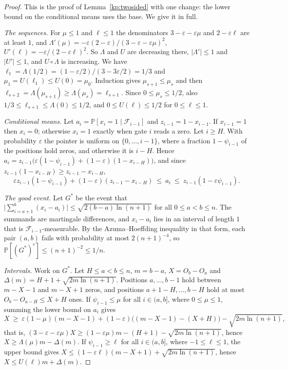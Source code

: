 \documentclass[11pt]{amsart}
\theoremstyle{definition}
\theoremstyle{remark}
\newcommand{\eps}{\varepsilon}
\newcommand{\PP}{\mathbb{P}}
\newcommand{\cF}{\mathcal{F}}
\begin{document}
\begin{proof}
This is the proof of Lemma~\ref{kp:twosided} with one change: the lower bound on the conditional means
uses the base. We give it in full.

\emph{The sequences.} For $\mu\le1$ and $\ell\le1$ the denominators $3-\eps-\eps\mu$ and
$2-\eps\ell$ are at least $1$, and $\Lambda'(\mu)=-\eps(2-\eps)/(3-\eps-\eps\mu)^2$,
$U'(\ell)=-\eps/(2-\eps\ell)^2$. So $\Lambda$ and $U$ are decreasing there, $|\Lambda'|\le1$ and
$|U'|\le1$, and $U\circ\Lambda$ is increasing. We have $\ell_1=\Lambda(1/2)=(1-\eps/2)/(3-3\eps/2)=1/3$
and $\mu_1=U(\ell_1)\le U(0)=\mu_0$. Induction gives $\mu_{s+1}\le\mu_s$ and then
$\ell_{s+2}=\Lambda(\mu_{s+1})\ge\Lambda(\mu_s)=\ell_{s+1}$. Since $0\le\mu_s\le1/2$, also
$1/3\le\ell_{s+1}\le\Lambda(0)\le1/2$, and $0\le U(\ell)\le1/2$ for $0\le\ell\le1$.

\emph{Conditional means.} Let $a_i=\PP[x_i=1\mid\cF_{i-1}]$ and $z_{i-1}=1-x_{i-1}$. If $x_{i-1}=1$
then $x_i=0$; otherwise $x_i=1$ exactly when gate $i$ reads a zero. Let $i\ge H$. With probability
$\eps$ the pointer is uniform on $\{0,\dots,i-1\}$, where a fraction $1-\psi_{i-1}$ of the
positions hold zeros, and otherwise it is $i-H$. Hence
$a_i=z_{i-1}\bigl(\eps(1-\psi_{i-1})+(1-\eps)(1-x_{i-H})\bigr)$, and since
$z_{i-1}(1-x_{i-H})\ge z_{i-1}-x_{i-H}$,
\[
\eps z_{i-1}(1-\psi_{i-1})+(1-\eps)(z_{i-1}-x_{i-H})\ \le\ a_i\ \le\ z_{i-1}(1-\eps\psi_{i-1}).
\]

\emph{The good event.} Let $G^*$ be the event that
$\bigl|\sum_{i=a+1}^{b}(x_i-a_i)\bigr|\le\sqrt{2(b-a)\ln(n+1)}$ for all $0\le a<b\le n$. The
summands are martingale differences, and $x_i-a_i$ lies in an interval of length $1$ that is
$\cF_{i-1}$-measurable. By the Azuma--Hoeffding inequality in that form, each pair $(a,b)$ fails
with probability at most $2(n+1)^{-4}$, so $\PP[(G^*)^c]\le(n+1)^{-2}\le1/n$.

\emph{Intervals.} Work on $G^*$. Let $H\le a<b\le n$, $m=b-a$, $X=O_b-O_a$ and
$\Delta(m)=H+1+\sqrt{2m\ln(n+1)}$. Positions $a,\dots,b-1$ hold between $m-X-1$ and $m-X+1$ zeros,
and positions $a+1-H,\dots,b-H$ hold at most $O_b-O_{a-H}\le X+H$ ones. If $\psi_{i-1}\le\mu$ for
all $i\in(a,b]$, where $0\le\mu\le1$, summing the lower bound on $a_i$ gives
\[
X\ \ge\ \eps(1-\mu)(m-X-1)+(1-\eps)\bigl((m-X-1)-(X+H)\bigr)-\sqrt{2m\ln(n+1)},
\]
that is, $(3-\eps-\eps\mu)X\ge(1-\eps\mu)m-(H+1)-\sqrt{2m\ln(n+1)}$, hence
$X\ge\Lambda(\mu)m-\Delta(m)$. If $\psi_{i-1}\ge\ell$ for all $i\in(a,b]$, where $-1\le\ell\le1$,
the upper bound gives $X\le(1-\eps\ell)(m-X+1)+\sqrt{2m\ln(n+1)}$, hence
$X\le U(\ell)m+\Delta(m)$.


\end{proof}
\end{document}
